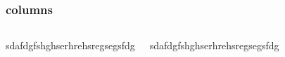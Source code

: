\begin{frame}
\frametitle{columns}

\begin{columns}

sdafdgfshghserhrehsregsegsfdg


sdafdgfshghserhrehsregsegsfdg

\end{columns}

\end{frame}




